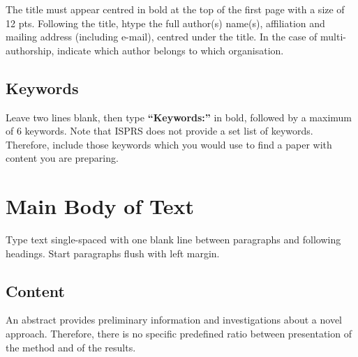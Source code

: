 \documentclass{isprs} %
\begin{document}
The title must appear centred in bold at the top of the first page with a size of 12 pts. Following the title, htype the full author(s) name(s), affiliation and mailing address (including e-mail), centred under the title. In the case of multi-authorship, indicate which author belongs to which organisation.




\subsection{Keywords}\label{sec:Keywords}

Leave two lines blank, then type \textbf{``Keywords:''} in bold, followed by a maximum of 6 keywords. Note that ISPRS does not provide a set list of keywords. Therefore, include those keywords which you would use to find a paper with content you are preparing.

\section{Main Body of Text}\label{sec:MAIN BODY OF TEXT}

Type text single-spaced with one blank line between paragraphs and 
following headings. Start paragraphs flush with left margin.

\subsection{Content}\label{sec:Content}
An abstract provides preliminary information and investigations about a novel approach. Therefore, there is no specific predefined ratio between presentation of the method and of the results.
\end{document}
